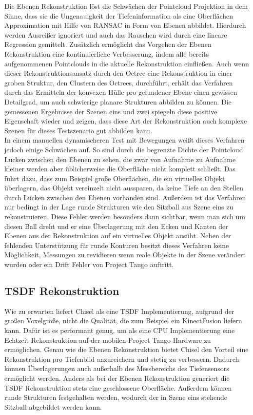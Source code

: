 Die Ebenen Rekonstruktion löst die Schwächen der Pointcloud Projektion in dem Sinne, dass sie die Ungenauigkeit der Tiefeninformation als eine Oberflächen Approximation mit Hilfe von RANSAC in Form von Ebenen abbildet. Hierdurch werden Ausreißer ignoriert und auch das Rauschen wird durch eine lineare Regression gemittelt. Zusätzlich ermöglicht das Vorgehen der Ebenen Rekonstruktion eine kontinuierliche Verbesserung, indem alle bereits aufgenommenen Pointclouds in die aktuelle Rekonstruktion einfließen. Auch wenn dieser Rekonstruktionsansatz durch den Octree eine Rekonstruktion in einer groben Struktur, den Clustern des Octrees, durchführt, erhält das Verfahren durch das Ermitteln der konvexen Hülle pro gefundener Ebene einen gewissen Detailgrad, um auch schwierige planare Strukturen abbilden zu können. Die gemessenen Ergebnisse der Szenen eins und zwei spiegeln diese positive Eigenschaft wieder und zeigen, dass diese Art der Rekonstruktion auch komplexe Szenen für dieses Testszenario gut abbilden kann.\\

In einem manuellen dynamischeren Test mit Bewegungen weißt dieses Verfahren jedoch einige Schwächen auf. So sind durch die begrenzte Dichte der Pointcloud Lücken zwischen den Ebenen zu sehen, die zwar von Aufnahme zu Aufnahme kleiner werden aber üblicherweise die Oberfläche nicht komplett schließt. Das führt dazu, dass zum Beispiel große Oberflächen, die ein virtuelles Objekt überlagern, das Objekt vereinzelt nicht aussparen, da keine Tiefe an den Stellen durch Lücken zwischen den Ebenen vorhanden sind. Außerdem ist das Verfahren nur bedingt in der Lage runde Strukturen wie den Sitzball aus Szene eins zu rekonstruieren. Diese Fehler werden besonders dann sichtbar, wenn man sich um diesen Ball dreht und er eine Überlagerung mit den Ecken und Kanten der Ebenen aus der Rekonstruktion auf ein virtuelles Objekt ausübt. Neben der fehlenden Unterstützung für runde Konturen besitzt dieses Verfahren keine Möglichkeit, Messungen zu revidieren wenn reale Objekte in der Szene verändert wurden oder ein Drift Fehler von Project Tango auftritt.

\subsection*{TSDF Rekonstruktion}

Wie zu erwarten liefert Chisel als eine TSDF Implementierung, aufgrund der großen Voxelgröße, nicht die Qualität, die zum Beispiel ein KinectFusion liefern kann. Dafür ist es performant genug, um als eine CPU Implementierung eine Echtzeit Rekonstruktion auf der mobilen Project Tango Hardware zu ermöglichen. Genau wie die Ebenen Rekonstruktion bietet Chisel den Vorteil eine Rekonstruktion pro Tiefenbild anzureichern und stetig zu verbessern. Dadurch können Überlagerungen auch außerhalb des Messbereichs des Tiefensensors ermöglicht werden. Anders als bei der Ebenen Rekonstruktion generiert die TSDF Rekonstruktion stets eine geschlossene Oberfläche. Außerdem können runde Strukturen festgehalten werden, wodurch der in Szene eins stehende Sitzball abgebildet werden kann. \\

